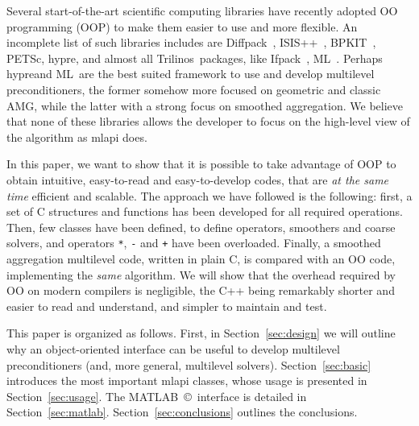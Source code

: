 \documentclass{article}[11pt]
\newcommand{\ML}     {{\sc ML}}
\newcommand{\trilinos}  {{\sc Trilinos}}
\newcommand{\ifpack}  {{\sc Ifpack}}
\newcommand{\MLAPI}  {{\sc mlapi }}
\newcommand{\mlapi}  {{\sc mlapi }}
\newcommand{\hypre}  {{\sc hypre}}
\newcommand{\petsc}  {{\sc PETSc}}
\begin{document}
\smallskip

Several start-of-the-art scientific computing libraries have recently adopted
OO programming (OOP) to make them easier to use and more flexible. An
incomplete list of 
such libraries includes are Diffpack~\cite{bruaset97object}, 
ISIS++~\cite{isis-guide}, BPKIT~\cite{bpkit}, \petsc\cite{petsc-guide},
  \hypre \cite{hypre}, and almost all \trilinos\ packages, like \ifpack~\cite{ifpack-guide}, \ML~\cite{ml-guide}.
  Perhaps \hypre and \ML~are the best suited framework to use and develop
  multilevel preconditioners, the former somehow more focused on geometric and
  classic AMG, while the latter with a strong focus on smoothed aggregation.
  We believe that none of these libraries allows the developer to focus on the
  high-level view of the algorithm as \mlapi does. 

\smallskip

In this paper, we want to show
that it is possible to take advantage of OOP to obtain intuitive,
easy-to-read and easy-to-develop codes, that are {\sl at the same time}
efficient and scalable. The approach we have followed is the following:
first, a set of C structures and functions has been developed for all 
required operations. Then, few classes have been defined, to define
operators, smoothers and coarse solvers, and operators \verb!*!, \verb!-! and
\verb!+! have been overloaded. Finally, a smoothed aggregation multilevel
code, written in plain C, is compared with an OO code, implementing the 
{\sl same} algorithm.  We will show that the overhead
required by OO on modern compilers is negligible, the C++ being remarkably
shorter and easier to read and understand, and simpler to maintain and test.


\smallskip

This paper is organized as follows. First, in Section~\ref{sec:design}
we will outline why an object-oriented interface can be useful to develop
multilevel preconditioners (and, more general, multilevel solvers).
Section~\ref{sec:basic} introduces the most important \MLAPI classes, whose
usage is presented in Section~\ref{sec:usage}. The MATLAB~\copyright~interface is
detailed in Section~\ref{sec:matlab}.  Section~\ref{sec:conclusions} outlines the conclusions.
\end{document}
